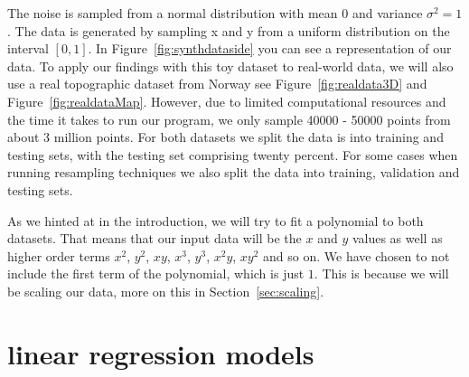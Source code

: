 \documentclass[twoside,11pt]{report}
\begin{document}
The noise is sampled from a normal distribution with mean 0 and variance $\sigma^2 = 1$.
The data is generated by sampling x and y from a uniform distribution on the interval $[0, 1]$.
In Figure~\ref{fig:synthdataside} you can see a representation of our data.
To apply our findings with this toy dataset to real-world data, we will also use a 
real topographic dataset from Norway see Figure~\ref{fig:realdata3D} and Figure~\ref{fig:realdataMap}. 
However, due to limited computational resources and the time it takes to run our program, we only sample 
40000 - 50000 points from about 3 million points. For both datasets we split the data is into 
training and testing sets, with the testing set comprising twenty percent. For some cases when running
resampling techniques we also split the data into training, validation and testing sets.

As we hinted at in the introduction, we will try to fit a polynomial to both datasets. That means that our input data will be 
the $x$ and $y$ values as well as higher order terms $x^2$, $y^2$, $xy$, $x^3$, $y^3$, $x^2y$, $xy^2$ and so on.
We have chosen to not include the first term of the polynomial, which is just $1$. This is because we will be scaling our data,
more on this in Section~\ref{sec:scaling}.\\








\section{linear regression models }
\label{sec:models}
\end{document}
